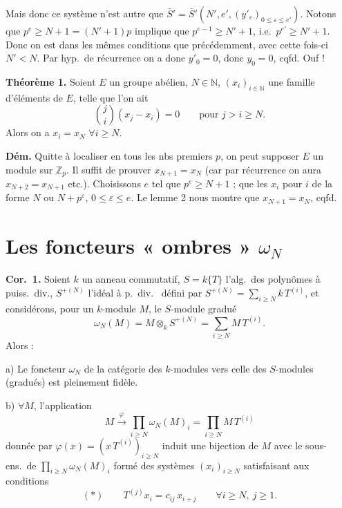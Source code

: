 \documentclass[11pt,a4paper]{article}
\begin{document}
Mais donc ce système n'est autre que
$\bar S' = \bar S'(N', e', (y'_\varepsilon)_{0 \leq \varepsilon \leq e'})$.
Notons que $p^e \geq N+1 = (N'+1)p$ implique que $p^{e-1} \geq N'+1$, i.e.\
$p^{e'} \geq N' + 1$. Donc on est dans les mêmes conditions que précédemment,
avec cette fois-ci $N' < N$. Par hyp.\ de récurrence on a donc $y'_0 = 0$, donc $y_0 = 0$,
cqfd. Ouf !

\textbf{Théorème 1.} Soient $E$ un groupe abélien, $N \in \mathbb{N}$, $(x_i)_{i \in \mathbb{N}}$
une famille d'éléments de $E$, telle que l'on ait
\[
  \binom{j}{i} (x_j - x_i) = 0 \qquad \text{pour } j > i \geq N .
\]
Alors on a $x_i = x_N$ $\forall i \geq N$.

\textbf{Dém.} Quitte à localiser en tous les nbs premiers $p$, on peut supposer $E$ un module
sur $\mathbb{Z}_p$. Il suffit de prouver $x_{N+1} = x_N$ (car par récurrence on aura
$x_{N+2} = x_{N+1}$ etc.). Choisissons $e$ \add{$\in \mathbb{N}$} tel que $p^e \geq N+1$ ;
\uncertain{ne retenons} que les $x_i$ pour $i$ de la forme $N$ ou $N + p^\varepsilon$,
$0 \leq \varepsilon \leq e$. Le lemme 2 nous montre que $x_{N+1} = x_N$, cqfd.

\section{Les foncteurs « ombres » $\omega_N$}

\textbf{Cor.\ 1.} Soient $k$ un anneau commutatif, $S = k\{T\}$ l'alg.\ des polynômes à
puiss.\ div., \struck{$M$ un $k$-module} $S^{+(N)}$ l'idéal à p.\ div.\
 défini par
$S^{+(N)} = \sum_{i \geq N} k\, T^{(i)}$, et considérons, pour un $k$-module $M$, le
$S$-module gradué
\[
  \omega_N(M) = M \otimes_k S^{+(N)} = \sum_{i \geq N} M\, T^{(i)} .
\]
Alors :

a) Le foncteur $\omega_N$ de la catégorie des $k$-modules vers celle des $S$-modules
(gradués) est pleinement fidèle.

b) $\forall M$,  l'application
\[
  M \xrightarrow{\ \varphi\ } \prod_{i \geq N} \omega_N(M)_i = \prod_{i \geq N} M\, T^{(i)}
\]
donnée par $\varphi(x) = (x\, T^{(i)})_{i \geq N}$ induit une bijection de $M$ avec le
sous-ens.\ de $\prod_{i \geq N} \omega_N(M)_i$ formé des systèmes $(x_i)_{i \geq N}$
satisfaisant aux conditions
\[
  (*) \qquad T^{(j)} x_i = c_{ij}\, x_{i+j} \qquad \forall i \geq N,\ j \geq 1 .
\]
\end{document}
